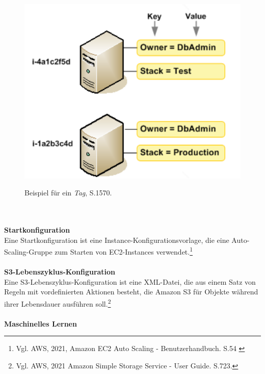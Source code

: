 \begin{figure}[h!]
  \centering
  \includegraphics[scale=0.4]{sources/TagExample}
  \caption[Beispiel für ein Tag]{}\label{fig:TagExample}
  Beispiel für ein \textit{Tag}{\cite{AMZ26}, S.1570}.
\end{figure}
\\\\
\textbf{Startkonfiguration}\\
Eine Startkonfiguration ist eine Instance-Konfigurationsvorlage, die eine Auto-Scaling-Gruppe zum Starten von EC2-Instances verwendet.\footnote{Vgl. AWS, 2021, Amazon EC2 Auto Scaling - Benutzerhandbuch. S.54 \cite{AMZ31}}
\\\\
\textbf{S3-Lebenszyklus-Konfiguration}\\
Eine S3-Lebenszyklus-Konfiguration ist eine XML-Datei, die aus einem Satz von Regeln mit vordefinierten
Aktionen besteht, die Amazon S3 für Objekte während ihrer Lebensdauer ausführen soll.\footnote{Vgl. AWS, 2021 Amazon Simple Storage Service - User Guide. S.723.\cite{AMZ18}}
\\\\
\textbf{Maschinelles Lernen}\\
